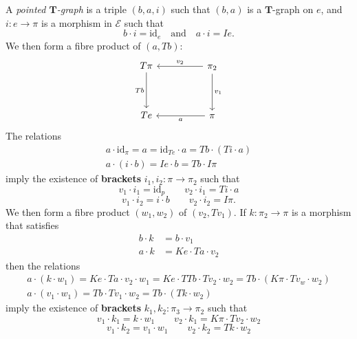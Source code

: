 \documentclass[fleqn]{article}
\newcommand{\oldpage}[1]{\marginpar{\footnotesize$\Big\vert$ \textit{p.~#1}}}
\newcommand{\unsure}[1]{{\color{purple}\textbf{#1}}}
\newcommand{\id}{\mathrm{id}}
\newcommand{\TT}{\mathbf{T}}
\newcommand{\textand}{\quad\text{and}\quad}
\newcommand{\cat}[1]{\mathcal{#1}}
\begin{document}
A \emph{pointed $\TT$-graph} is a triple $(b,a,i)$ such that $(b,a)$ is a $\TT$-graph on $e$, and $i\colon e\to\pi$ is a morphism in $\cat{E}$ such that
\[
  b\cdot i = \id_e
  \textand
  a\cdot i= Ie.
  \tag{1}
\]
We then form a fibre product of $(a,Tb)$:
\[
  \begin{tikzcd}[sep=huge]
    T\pi
      \ar[d,swap,"Tb"]
  & \pi_2
      \ar[l,swap,"v_2"]
      \ar[d,"v_1"]
  \\Te
  & \pi
      \ar[l,"a"]
  \end{tikzcd}
\]
The relations
\[
  \begin{gathered}
    a\cdot\id_\pi
    = a
    = \id_{Te}\cdot a
    = Tb\cdot(Ti\cdot a)
  \\a\cdot(i\cdot b)
    = Ie\cdot b
    = Tb\cdot I\pi
  \end{gathered}
\]
imply the existence of \unsure{brackets} $i_1,i_2\colon\pi\to\pi_2$ such that
\[
  v_1\cdot i_1
  = \id_p
  \qquad
  v_2\cdot i_1
  = Ti\cdot a
  \tag{2}
\]
\[
  v_1\cdot i_2
  = i\cdot b
  \qquad
  v_2\cdot i_2
  = I\pi.
  \tag{3}
\]
\oldpage{226}
We then form a fibre product $(w_1,w_2)$ of $(v_2,Tv_1)$.
If $k\colon\pi_2\to\pi$ is a morphism that satisfies
\[
  \begin{aligned}
    b\cdot k
    &= b\cdot v_1
  \\a\cdot k
    &= Ke\cdot Ta\cdot v_2
  \end{aligned}
  \tag{4}
\]
then the relations
\[
  \begin{gathered}
    a\cdot(k\cdot w_1)
    = Ke\cdot Ta\cdot v_2\cdot w_1
    = Ke\cdot TTb\cdot Tv_2\cdot w_2
    = Tb\cdot(K\pi\cdot Tv_w\cdot w_2)
  \\a\cdot(v_1\cdot w_1)
    = Tb\cdot Tv_1\cdot w_2
    = Tb\cdot (Tk\cdot w_2)
  \end{gathered}
\]
imply the existence of \unsure{brackets} $k_1,k_2\colon\pi_3\to\pi_2$ such that
\[
  v_1\cdot k_1
  = k\cdot w_1
  \qquad
  v_2\cdot k_1
  = K\pi\cdot Tv_2\cdot w_2
  \tag{5}
\]
\[
  v_1\cdot k_2
  = v_1\cdot w_1
  \qquad
  v_2\cdot k_2
  = Tk\cdot w_2
  \tag{6}
\]
\end{document}
